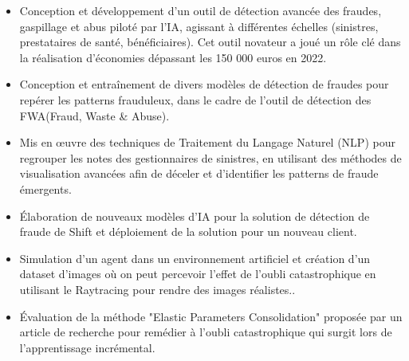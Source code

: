 \documentclass[10pt,letter,ragged2e,withhyper]{altacv}
\renewcommand{\divider}{\textcolor{body!30}{\hdashrule{\linewidth}{0.6pt}{0.5ex}}\medskip}
\begin{document}
\begin{paracol}{2}
\divider
{}

\begin{itemize}
  \item Conception et développement d'un outil de détection avancée des fraudes, gaspillage et abus piloté par l'IA, agissant à différentes échelles (sinistres, prestataires de santé, bénéficiaires). Cet outil novateur a joué un rôle clé dans la réalisation d'économies dépassant les 150 000 euros en 2022.
  \item Conception et entraînement de divers modèles de détection de fraudes pour repérer les patterns frauduleux, dans le cadre de l'outil de détection des FWA(Fraud, Waste \& Abuse).
\end{itemize}

\divider
{}

\begin{itemize}
  \item Mis en œuvre des techniques de Traitement du Langage Naturel (NLP) pour regrouper les notes des gestionnaires de sinistres, en utilisant des méthodes de visualisation avancées afin de déceler et d'identifier les patterns de fraude émergents.
  \item Élaboration de nouveaux modèles d'IA pour la solution de détection de fraude de Shift et déploiement de la solution pour un nouveau client.
\end{itemize}

\divider
{}

\begin{itemize}
  \item Simulation d'un agent dans un environnement artificiel et création d'un dataset d'images où on peut percevoir l'effet de l'oubli catastrophique en utilisant le Raytracing pour rendre des images réalistes..
  \item Évaluation de la méthode "Elastic Parameters Consolidation" proposée par un article de recherche pour remédier à l'oubli catastrophique qui surgit lors de l'apprentissage incrémental.
\end{itemize}





\end{paracol}
\end{document}
